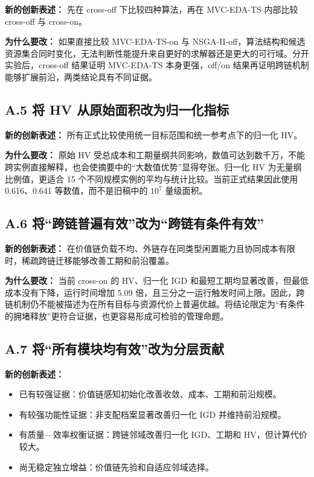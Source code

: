 \documentclass[UTF8,11pt]{ctexart}
\begin{document}
\textbf{新的创新表述：} 先在 cross-off 下比较四种算法，再在 MVC-EDA-TS 内部比较 cross-off 与 cross-on。

\textbf{为什么要改：} 如果直接比较 MVC-EDA-TS-on 与 NSGA-II-off，算法结构和候选资源集合同时变化，无法判断性能提升来自更好的求解器还是更大的可行域。分开实验后，cross-off 结果证明 MVC-EDA-TS 本身更强，off/on 结果再证明跨链机制能够扩展前沿，两类结论具有不同证据。

\subsection*{A.5 将 HV 从原始面积改为归一化指标}

\textbf{新的创新表述：} 所有正式比较使用统一目标范围和统一参考点下的归一化 HV。

\textbf{为什么要改：} 原始 HV 受总成本和工期量纲共同影响，数值可达到数千万，不能跨实例直接解释，也会使摘要中的“大数值优势”显得夸张。归一化 HV 为无量纲比例值，更适合 15 个不同规模实例的平均与统计比较。当前正式结果因此使用 0.616、0.641 等数值，而不是旧稿中的 \(10^7\) 量级面积。

\subsection*{A.6 将“跨链普遍有效”改为“跨链有条件有效”}

\textbf{新的创新表述：} 在价值链负载不均、外链存在同类型闲置能力且协同成本有限时，稀疏跨链迁移能够改善工期和前沿覆盖。

\textbf{为什么要改：} 当前 cross-on 的 HV、归一化 IGD 和最短工期均显著改善，但最低成本没有下降，运行时间增加 5.09 倍，且三分之一运行触发时间上限。因此，跨链机制仍不能被描述为在所有目标与资源代价上普遍优越。将结论限定为“有条件的拥堵释放”更符合证据，也更容易形成可检验的管理命题。

\subsection*{A.7 将“所有模块均有效”改为分层贡献}

\textbf{新的创新表述：}

\begin{itemize}
\item 已有较强证据：价值链感知初始化改善收敛、成本、工期和前沿规模。
\item 有较强功能性证据：非支配档案显著改善归一化 IGD 并维持前沿规模。
\item 有质量—效率权衡证据：跨链邻域改善归一化 IGD、工期和 HV，但计算代价较大。
\item 尚无稳定独立增益：价值链先验和自适应邻域选择。
\end{itemize}
\end{document}
